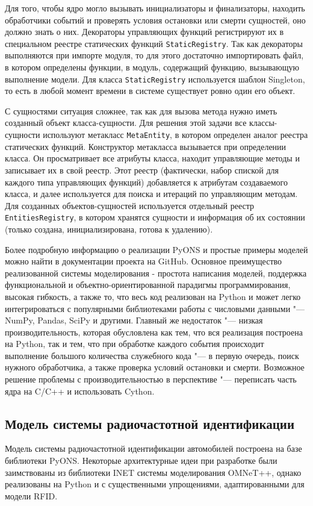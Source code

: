 Для того, чтобы ядро могло вызывать инициализаторы и финализаторы, находить обработчики событий и проверять условия остановки или смерти сущностей, оно должно знать о них. Декораторы управляющих функций регистрируют их в специальном реестре статических функций \texttt{StaticRegistry}. Так как декораторы выполняются при импорте модуля, то для этого достаточно импортировать файл, в котором определены функции, в модуль, содержащий функцию, вызывающую выполнение модели. Для класса \texttt{StaticRegistry} используется шаблон Singleton, то есть в любой момент времени в системе существует ровно один его объект.

С сущностями ситуация сложнее, так как для вызова метода нужно иметь созданный объект класса-сущности. Для решения этой задачи все классы-сущности используют метакласс \texttt{MetaEntity}, в котором определен аналог реестра статических функций. Конструктор метакласса вызывается при определении класса. Он просматривает все атрибуты класса, находит управляющие методы и записывает их в свой реестр. Этот реестр (фактически, набор спиской  для каждого типа управляющих функций) добавляется к атрибутам создаваемого класса, и далее используется для поиска и итераций по управляющим методам. Для созданных объектов-сущностей используется отдельный реестр \texttt{EntitiesRegistry}, в котором хранятся сущности и информация об их состоянии (только создана, инициализирована, готова к удалению).

Более подробную информацию о реализации PyONS и простые примеры моделей можно найти в документации проекта на GitHub. Основное преимущество реализованной системы моделирования - простота написания моделей, поддержка функциональной и объектно-ориентированной парадигмы программирования, высокая гибкость, а также то, что весь код реализован на Python и может легко интегрироваться с популярными библиотеками работы с числовыми данными "--- NumPy, Pandas, SciPy и другими. Главный же недостаток "--- низкая производительность, которая обусловлена как тем, что вся реализация построена на Python, так и тем, что при обработке каждого события происходит выполнение большого количества служебного кода "--- в первую очередь, поиск нужного обработчика, а также проверка условий остановки и смерти. Возможное решение проблемы с производительностью в перспективе "--- переписать часть ядра на C/C++ и использовать Cython.




\subsection{Модель системы радиочастотной идентификации}
Модель системы радиочастотной идентификации автомобилей построена на базе библиотеки PyONS. Некоторые архитектурные идеи при разработке были заимствованы из библиотеки INET системы моделирования OMNeT++, однако реализованы на Python и с существенными упрощениями, адаптированными для модели RFID.

